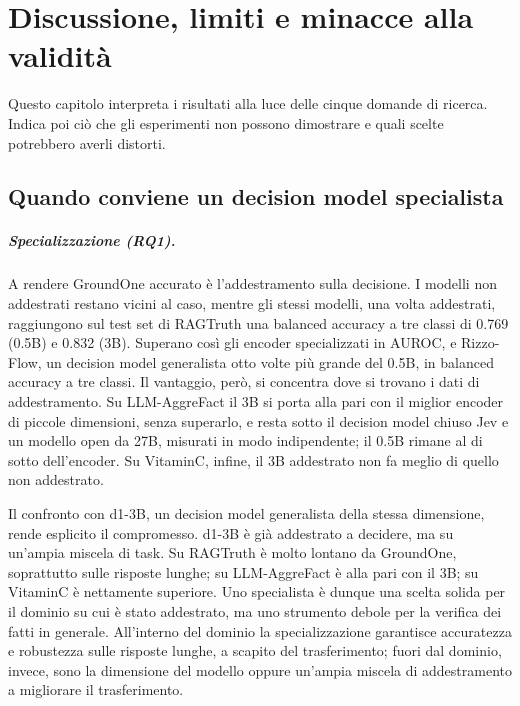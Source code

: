 \chapter{Discussione, limiti e minacce alla validità}
\label{sec:discussion}


Questo capitolo interpreta i risultati alla luce delle cinque domande di ricerca. Indica poi ciò che gli esperimenti non
possono dimostrare e quali scelte potrebbero averli distorti.

\section{Quando conviene un decision model specialista}
\label{sec:disc-synthesis}

\paragraph{Specializzazione (RQ1).} A rendere GroundOne accurato è l'addestramento sulla decisione. I modelli non
addestrati restano vicini al caso, mentre gli stessi modelli, una volta addestrati, raggiungono sul test set di RAGTruth
una balanced accuracy a tre classi di 0.769 (0.5B) e 0.832 (3B). Superano così gli encoder specializzati in AUROC, e Rizzo-Flow, un decision model generalista otto volte più grande del 0.5B, in balanced accuracy a tre classi. Il vantaggio, però, si
concentra dove si trovano i dati di addestramento. Su LLM-AggreFact il 3B si porta alla pari con il miglior encoder di
piccole dimensioni, senza superarlo, e resta sotto il decision model chiuso Jev e un modello open da 27B, misurati in modo
indipendente; il 0.5B rimane al di sotto dell'encoder. Su VitaminC, infine, il 3B addestrato non fa meglio di quello non
addestrato.

Il confronto con d1-3B, un decision model generalista della stessa dimensione, rende esplicito il compromesso. d1-3B è già
addestrato a decidere, ma su un'ampia miscela di task. Su RAGTruth è molto lontano da GroundOne, soprattutto sulle
risposte lunghe; su LLM-AggreFact è alla pari con il 3B; su VitaminC è nettamente superiore. Uno specialista è dunque una
scelta solida per il dominio su cui è stato addestrato, ma uno strumento debole per la verifica dei fatti in generale.
All'interno del dominio la specializzazione garantisce accuratezza e robustezza sulle risposte lunghe, a scapito del
trasferimento; fuori dal dominio, invece, sono la dimensione del modello oppure un'ampia miscela di addestramento a
migliorare il trasferimento.

